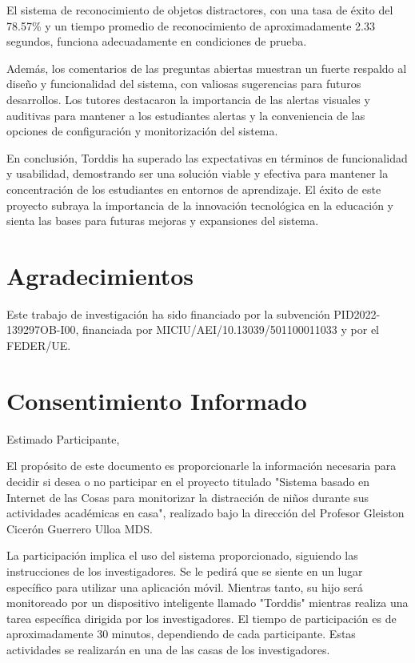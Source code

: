 \documentclass[a4paper,fleqn]{cas-sc}
\begin{document}
	El sistema de reconocimiento de objetos distractores, con una tasa de éxito del 78.57\% y un tiempo promedio de reconocimiento de aproximadamente 2.33 segundos, funciona adecuadamente en condiciones de prueba.
	
	Además, los comentarios de las preguntas abiertas muestran un fuerte respaldo al diseño y funcionalidad del sistema, con valiosas sugerencias para futuros desarrollos. Los tutores destacaron la importancia de las alertas visuales y auditivas para mantener a los estudiantes alertas y la conveniencia de las opciones de configuración y monitorización del sistema.
	
	En conclusión, Torddis ha superado las expectativas en términos de funcionalidad y usabilidad, demostrando ser una solución viable y efectiva para mantener la concentración de los estudiantes en entornos de aprendizaje. El éxito de este proyecto subraya la importancia de la innovación tecnológica en la educación y sienta las bases para futuras mejoras y expansiones del sistema.
	
	\section*{Agradecimientos}
	
	Este trabajo de investigación ha sido financiado por la subvención PID2022-139297OB-I00, financiada por MICIU/AEI/10.13039/501100011033 y por el FEDER/UE.
	
	\printcredits
	
	
	
	
	
	\clearpage
	
	\appendix
	\section{Consentimiento Informado} \label{Appendix:InformedConsent}
	Estimado Participante,
	
	El propósito de este documento es proporcionarle la información necesaria para decidir si desea o no participar en el proyecto titulado "Sistema basado en Internet de las Cosas para monitorizar la distracción de niños durante sus actividades académicas en casa", realizado bajo la dirección del Profesor Gleiston Cicerón Guerrero Ulloa MDS.
	
	La participación implica el uso del sistema proporcionado, siguiendo las instrucciones de los investigadores. Se le pedirá que se siente en un lugar específico para utilizar una aplicación móvil. Mientras tanto, su hijo será monitoreado por un dispositivo inteligente llamado "Torddis" mientras realiza una tarea específica dirigida por los investigadores. El tiempo de participación es de aproximadamente 30 minutos, dependiendo de cada participante. Estas actividades se realizarán en una de las casas de los investigadores.
	
\end{document}
